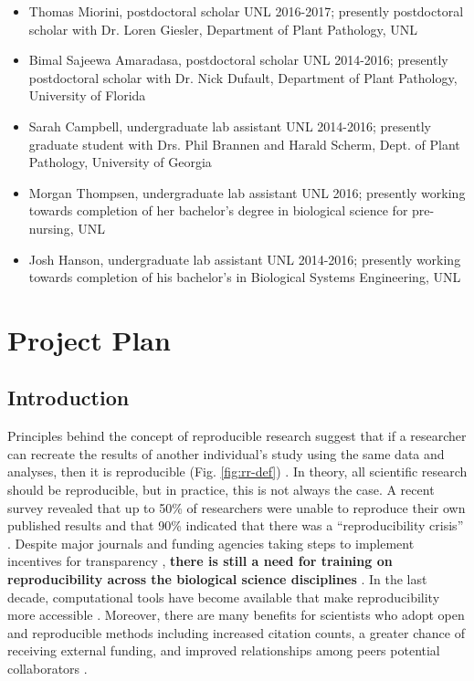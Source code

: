 \documentclass[12pt,letterpaper]{article}
\begin{document}
\begin{itemize}
  \item Thomas Miorini, postdoctoral scholar UNL 2016-2017; presently postdoctoral scholar with Dr. Loren Giesler, Department of Plant Pathology, UNL

  \item Bimal Sajeewa Amaradasa, postdoctoral scholar UNL 2014-2016; presently postdoctoral scholar with Dr. Nick Dufault, Department of Plant Pathology, University of Florida

  \item Sarah Campbell, undergraduate lab assistant UNL 2014-2016; presently graduate student with Drs. Phil Brannen and Harald Scherm, Dept. of Plant Pathology, University of Georgia

  \item Morgan Thompsen, undergraduate lab assistant UNL 2016; presently working towards completion of her bachelor's degree in biological science for pre-nursing, UNL

  \item Josh Hanson, undergraduate lab assistant UNL 2014-2016; presently working towards completion of his bachelor's in Biological Systems Engineering, UNL
\end{itemize}



\section{Project Plan}

\subsection{Introduction}

Principles behind the concept of reproducible research suggest that if a researcher can recreate the results of another individual's study using the same data and analyses, then it is reproducible (Fig. \ref{fig:rr-def}) \citep{buckheit1995wavelab,peng2011reproducible,patil2016statistical}. 
In theory, all scientific research should be reproducible, but in practice, this is not always the case.
A recent survey revealed that up to 50\% of researchers were unable to reproduce their own published results and that 90\% indicated that there was a ``reproducibility crisis'' \citep{baker2016scientists}.
Despite major journals and funding agencies taking steps to implement incentives for transparency \citep{nature2017announcement}, \textbf{there is still a need for training on reproducibility across the biological science disciplines} \citep{barone2017unmet}.
In the last decade, computational tools have become available that make reproducibility more accessible \citep{boettiger2015introduction,wilson2016good}.
Moreover, there are many benefits for scientists who adopt open and reproducible methods including increased citation counts, a greater chance of receiving external funding, and improved relationships among peers potential collaborators \citep{mckiernan2016open,stewart-lowndes2017path,schmidt2016stepping}.
\end{document}
